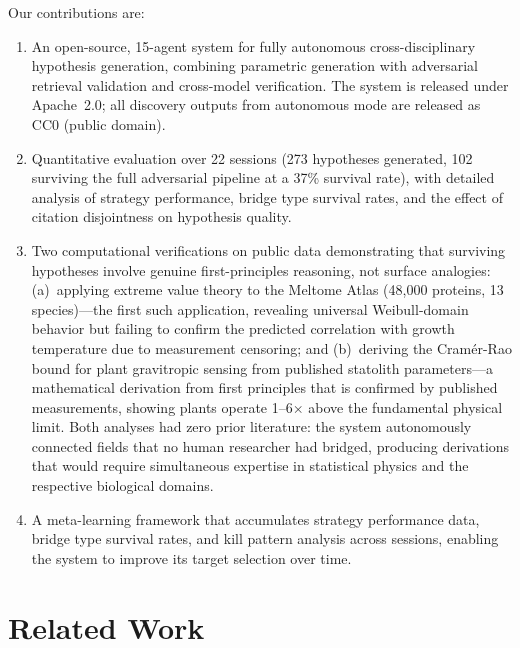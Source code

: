 Our contributions are:
\begin{enumerate}
    \item An open-source, 15-agent system for fully autonomous cross-disciplinary hypothesis generation, combining parametric generation with adversarial retrieval validation and cross-model verification. The system is released under Apache~2.0; all discovery outputs from autonomous mode are released as CC0 (public domain).

    \item Quantitative evaluation over 22 sessions (273 hypotheses generated, 102 surviving the full adversarial pipeline at a 37\% survival rate), with detailed analysis of strategy performance, bridge type survival rates, and the effect of citation disjointness on hypothesis quality.

    \item Two computational verifications on public data demonstrating that surviving hypotheses involve genuine first-principles reasoning, not surface analogies: (a)~applying extreme value theory to the Meltome Atlas (48,000 proteins, 13 species)---the first such application, revealing universal Weibull-domain behavior but failing to confirm the predicted correlation with growth temperature due to measurement censoring; and (b)~deriving the Cram\'{e}r-Rao bound for plant gravitropic sensing from published statolith parameters---a mathematical derivation from first principles that is confirmed by published measurements, showing plants operate 1--6$\times$ above the fundamental physical limit. Both analyses had zero prior literature: the system autonomously connected fields that no human researcher had bridged, producing derivations that would require simultaneous expertise in statistical physics and the respective biological domains.

    \item A meta-learning framework that accumulates strategy performance data, bridge type survival rates, and kill pattern analysis across sessions, enabling the system to improve its target selection over time.
\end{enumerate}


\section{Related Work}
\label{sec:related-work}

